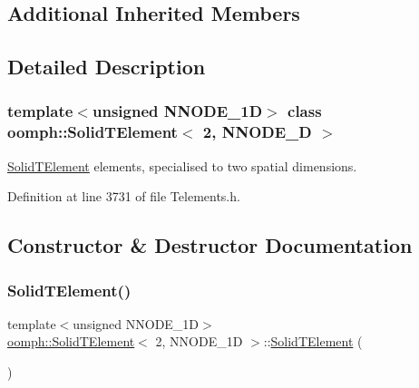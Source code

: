 \subsection*{Additional Inherited Members}


\subsection{Detailed Description}
\subsubsection*{template$<$unsigned N\+N\+O\+D\+E\+\_\+1D$>$\newline
class oomph\+::\+Solid\+T\+Element$<$ 2, N\+N\+O\+D\+E\+\_\+D $>$}

\hyperlink{classoomph_1_1SolidTElement}{Solid\+T\+Element} elements, specialised to two spatial dimensions. 

Definition at line 3731 of file Telements.\+h.



\subsection{Constructor \& Destructor Documentation}
\mbox{\label{classoomph_1_1SolidTElement_3_012_00_01NNODE__1D_01_4_a3ae7c8c0ccc5e31e86d5a354b8fa7052}} 
\subsubsection{\texorpdfstring{Solid\+T\+Element()}{SolidTElement()}\hspace{0.1cm}{\footnotesize\ttfamily [1/2]}}
{\footnotesize\ttfamily template$<$unsigned N\+N\+O\+D\+E\+\_\+1D$>$ \\
\hyperlink{classoomph_1_1SolidTElement}{oomph\+::\+Solid\+T\+Element}$<$ 2, N\+N\+O\+D\+E\+\_\+1D $>$\+::\hyperlink{classoomph_1_1SolidTElement}{Solid\+T\+Element} (\begin{DoxyParamCaption}{ }\end{DoxyParamCaption})\hspace{0.3cm}{\ttfamily [inline]}}



